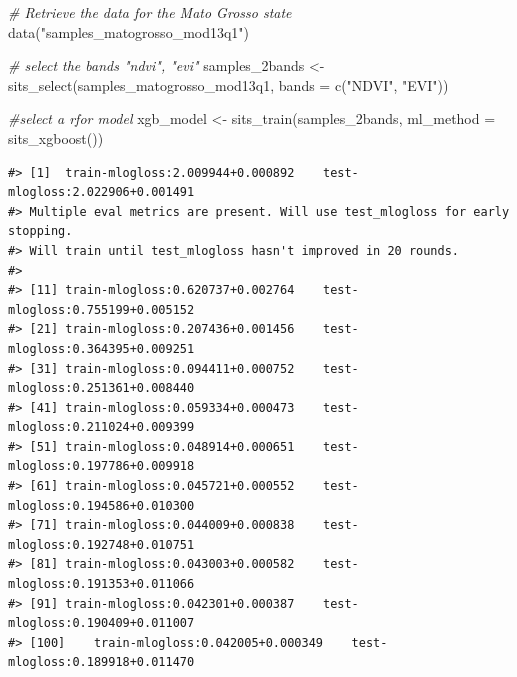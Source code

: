 \documentclass[a4paper,]{tufte-book}
\newenvironment{Shaded}{}{}
\newcommand{\AttributeTok}[1]{\textcolor[rgb]{0.49,0.56,0.16}{#1}}
\newcommand{\CommentTok}[1]{\textcolor[rgb]{0.38,0.63,0.69}{\textit{#1}}}
\newcommand{\FunctionTok}[1]{\textcolor[rgb]{0.02,0.16,0.49}{#1}}
\newcommand{\NormalTok}[1]{#1}
\newcommand{\OtherTok}[1]{\textcolor[rgb]{0.00,0.44,0.13}{#1}}
\newcommand{\StringTok}[1]{\textcolor[rgb]{0.25,0.44,0.63}{#1}}
\begin{document}
\begin{Shaded}
\begin{Highlighting}[]
\CommentTok{\# Retrieve the data for the Mato Grosso state}
\FunctionTok{data}\NormalTok{(}\StringTok{"samples\_matogrosso\_mod13q1"}\NormalTok{)}

\CommentTok{\# select the bands "ndvi", "evi"}
\NormalTok{samples\_2bands }\OtherTok{\textless{}{-}} \FunctionTok{sits\_select}\NormalTok{(samples\_matogrosso\_mod13q1, }\AttributeTok{bands =} \FunctionTok{c}\NormalTok{(}\StringTok{"NDVI"}\NormalTok{, }\StringTok{"EVI"}\NormalTok{))}

\CommentTok{\#select a rfor model}
\NormalTok{xgb\_model }\OtherTok{\textless{}{-}} \FunctionTok{sits\_train}\NormalTok{(samples\_2bands, }\AttributeTok{ml\_method =} \FunctionTok{sits\_xgboost}\NormalTok{())}
\end{Highlighting}
\end{Shaded}

\begin{verbatim}
#> [1]  train-mlogloss:2.009944+0.000892    test-mlogloss:2.022906+0.001491 
#> Multiple eval metrics are present. Will use test_mlogloss for early stopping.
#> Will train until test_mlogloss hasn't improved in 20 rounds.
#> 
#> [11] train-mlogloss:0.620737+0.002764    test-mlogloss:0.755199+0.005152 
#> [21] train-mlogloss:0.207436+0.001456    test-mlogloss:0.364395+0.009251 
#> [31] train-mlogloss:0.094411+0.000752    test-mlogloss:0.251361+0.008440 
#> [41] train-mlogloss:0.059334+0.000473    test-mlogloss:0.211024+0.009399 
#> [51] train-mlogloss:0.048914+0.000651    test-mlogloss:0.197786+0.009918 
#> [61] train-mlogloss:0.045721+0.000552    test-mlogloss:0.194586+0.010300 
#> [71] train-mlogloss:0.044009+0.000838    test-mlogloss:0.192748+0.010751 
#> [81] train-mlogloss:0.043003+0.000582    test-mlogloss:0.191353+0.011066 
#> [91] train-mlogloss:0.042301+0.000387    test-mlogloss:0.190409+0.011007 
#> [100]    train-mlogloss:0.042005+0.000349    test-mlogloss:0.189918+0.011470
\end{verbatim}
\end{document}
